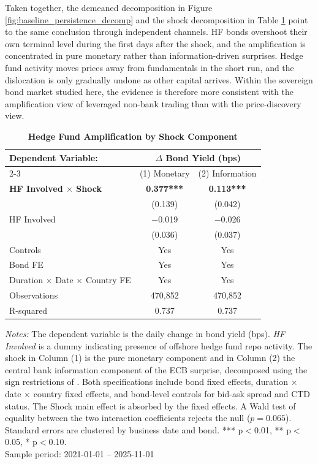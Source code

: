 \documentclass[english, 11pt, oneside]{article}
\begin{document}
Taken together, the demeaned decomposition in Figure \ref{fig:baseline_persistence_decomp} and the shock decomposition in Table \ref{tab:jk} point to the same conclusion through independent channels. HF bonds overshoot their own terminal level during the first days after the shock, and the amplification is concentrated in pure monetary rather than information-driven surprises. Hedge fund activity moves prices away from fundamentals in the short run, and the dislocation is only gradually undone as other capital arrives. Within the sovereign bond market studied here, the evidence is therefore more consistent with the amplification view of leveraged non-bank trading than with the price-discovery view.

\begin{table}[t]
\centering
\caption{\textbf{Hedge Fund Amplification by Shock Component}}
\footnotesize
\setlength{\tabcolsep}{10pt}
\renewcommand{\arraystretch}{1.1}
\begin{tabular}{l c c}
\toprule
\textbf{Dependent Variable:} & \multicolumn{2}{c}{\textbf{$\Delta$ Bond Yield (bps)}} \\
\cmidrule(lr){2-3}
 & (1) Monetary & (2) Information \\
\midrule
\textbf{HF Involved $\times$ Shock} & \textbf{0.377***} & \textbf{0.113***} \\
 & (0.139) & (0.042) \\
\addlinespace
HF Involved & $-$0.019 & $-$0.026 \\
 & (0.036) & (0.037) \\
\midrule
Controls & Yes & Yes \\
Bond FE & Yes & Yes \\
Duration $\times$ Date $\times$ Country FE & Yes & Yes \\
\midrule
Observations & 470,852 & 470,852 \\
R-squared & 0.737 & 0.737 \\
\bottomrule
\end{tabular}
\label{tab:jk}

\vspace{1ex}
\begin{minipage}{\textwidth}
\scriptsize
\textit{Notes:} The dependent variable is the daily change in bond yield (bps). \textit{HF Involved} is a dummy indicating presence of offshore hedge fund repo activity. The shock in Column (1) is the pure monetary component and in Column (2) the central bank information component of the ECB surprise, decomposed using the sign restrictions of \citet{jarocinski2020}. Both specifications include bond fixed effects, duration $\times$ date $\times$ country fixed effects, and bond-level controls for bid-ask spread and CTD status. The Shock main effect is absorbed by the fixed effects. A Wald test of equality between the two interaction coefficients rejects the null ($p = 0.065$). Standard errors are clustered by business date and bond. *** p$<$0.01, ** p$<$0.05, * p$<$0.10. \\ Sample period: 2021-01-01 -- 2025-11-01
\end{minipage}
\end{table}
\end{document}
